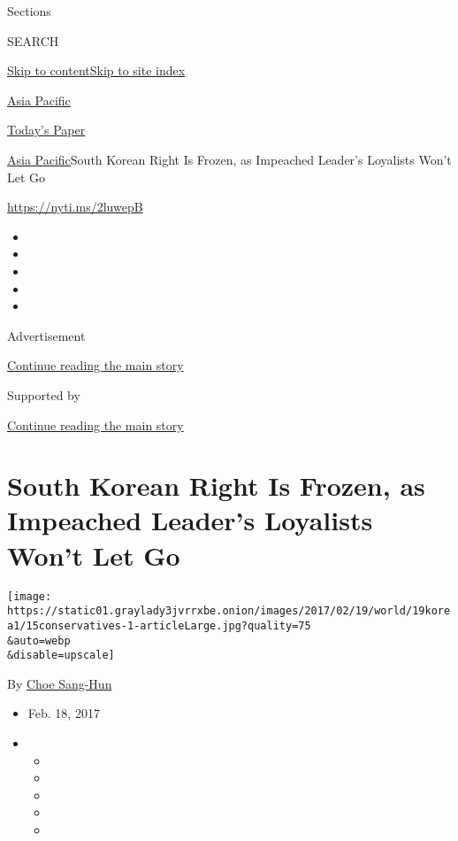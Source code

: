 Sections

SEARCH

\protect\hyperlink{site-content}{Skip to
content}\protect\hyperlink{site-index}{Skip to site index}

\href{https://www.nytimes3xbfgragh.onion/section/world/asia}{Asia
Pacific}

\href{https://myaccount.nytimes3xbfgragh.onion/auth/login?response_type=cookie\&client_id=vi}{}

\href{https://www.nytimes3xbfgragh.onion/section/todayspaper}{Today's
Paper}

\href{/section/world/asia}{Asia Pacific}\textbar{}South Korean Right Is
Frozen, as Impeached Leader's Loyalists Won't Let Go

\url{https://nyti.ms/2luwepB}

\begin{itemize}
\item
\item
\item
\item
\item
\end{itemize}

Advertisement

\protect\hyperlink{after-top}{Continue reading the main story}

Supported by

\protect\hyperlink{after-sponsor}{Continue reading the main story}

\hypertarget{south-korean-right-is-frozen-as-impeached-leaders-loyalists-wont-let-go}{%
\section{South Korean Right Is Frozen, as Impeached Leader's Loyalists
Won't Let
Go}\label{south-korean-right-is-frozen-as-impeached-leaders-loyalists-wont-let-go}}

\texttt{[image: https://static01.graylady3jvrrxbe.onion/images/2017/02/19/world/19korea1/15conservatives-1-articleLarge.jpg?quality=75\\\&auto=webp\\\&disable=upscale]}

By \href{http://www.nytimes3xbfgragh.onion/by/choe-sang-hun}{Choe
Sang-Hun}

\begin{itemize}
\item
  Feb. 18, 2017
\item
  \begin{itemize}
  \item
  \item
  \item
  \item
  \item
  \end{itemize}
\end{itemize}

